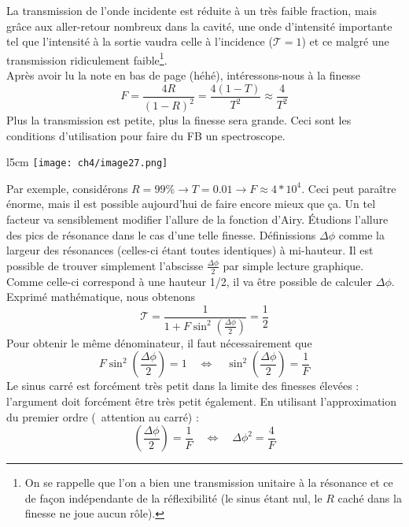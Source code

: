 La transmission de l'onde incidente est réduite à un très faible fraction, mais grâce aux aller-retour
nombreux dans la cavité, une onde d'intensité importante tel que l'intensité à la sortie vaudra 
celle à l'incidence ($\mathcal{T}=1$) et ce malgré une transmission ridiculement faible\footnote{On 
se rappelle que l'on a bien une transmission unitaire à la résonance et ce de façon indépendante de la 
réflexibilité (le sinus étant nul, le $R$ caché dans la finesse ne joue aucun rôle).}. \\

Après avoir lu la note en bas de page (héhé), intéressons-nous à la finesse
\begin{equation}
F = \frac{4R}{(1-R)^2}=\dfrac{4(1-T)}{T^2} \approx \frac{4}{T^2}
\end{equation}
Plus la transmission est petite, plus la finesse sera grande. Ceci sont les conditions d'utilisation 
pour faire du FB un spectroscope.\\

	\begin{wrapfigure}[8]{l}{5cm}
	\vspace{-8mm}
	\texttt{[image: ch4/image27.png]}
	\end{wrapfigure}
Par exemple, considérons $R=99\%\rightarrow T=0.01\rightarrow F\approx 4*10^4$. Ceci peut paraître 
énorme, mais il est possible aujourd'hui de faire encore mieux que ça. Un tel facteur va sensiblement 
modifier l'allure de la fonction d'Airy. Étudions l'allure des pics de résonance dans le cas d'une 
telle finesse. Définissions $\Delta\phi$ comme la largeur des résonances (celles-ci étant toutes 
identiques) à mi-hauteur. Il est possible de trouver simplement l'abscisse $\frac{\Delta \phi}{2}$ 
par simple lecture graphique. Comme celle-ci correspond à une hauteur 1/2, il va être possible de 
calculer $\Delta\phi$. Exprimé mathématique, nous obtenons
\begin{equation}
\mathcal{T} = \dfrac{1}{1+F\sin^2\left(\frac{\Delta\phi}{2}\right)}= \frac{1}{2}
\end{equation}
Pour obtenir le même dénominateur, il faut nécessairement que 
\begin{equation}
F\sin^2\left(\frac{\Delta\phi}{2}\right)=1\quad\Leftrightarrow\quad \sin^2\left(\frac{\Delta\phi}{2}\right)
=\dfrac{1}{F}
\end{equation}
Le sinus carré est forcément très petit dans la limite des finesses élevées : l'argument doit forcément 
être très petit également. En utilisant l'approximation du premier ordre (\danger\ attention au carré) :
\begin{equation}
\left(\frac{\Delta\phi}{2}\right) = \frac{1}{F}\quad\Leftrightarrow\quad \Delta\phi^2 = \frac{4}{F}
\end{equation}

